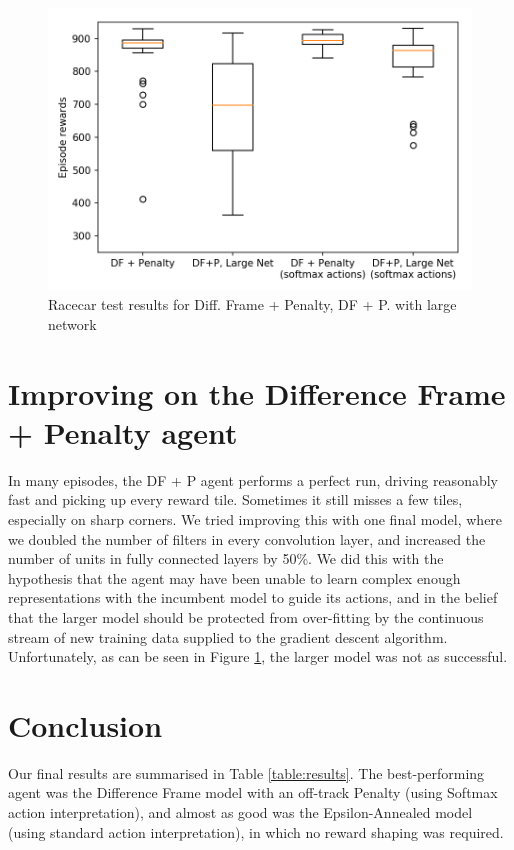 \documentclass[a4paper, 11pt, conference]{ieeeconf}      %
\begin{document}
\begin{figure}
  \includegraphics[width=\linewidth]{figs/racecar_4.png}
  \caption{Racecar test results for Diff. Frame + Penalty, DF + P. with large network}
  \label{fig:test4}
\end{figure}

\section{Improving on the Difference Frame + Penalty agent}

In many episodes, the DF + P agent performs a perfect run, driving reasonably fast and picking up every reward tile. Sometimes it still misses a few tiles, especially on sharp corners. We tried improving this with one final model, where we doubled the number of filters in every convolution layer, and increased the number of units in fully connected layers by 50\%. We did this with the hypothesis that the agent may have been unable to learn complex enough representations with the incumbent model to guide its actions, and in the belief that the larger model should be protected from over-fitting by the continuous stream of new training data supplied to the gradient descent algorithm. Unfortunately, as can be seen in Figure \ref{fig:test4}, the larger model was not as successful.

\section*{Conclusion}

Our final results are summarised in Table \ref{table:results}. The best-performing agent was the Difference Frame model with an off-track Penalty (using Softmax action interpretation), and almost as good was the Epsilon-Annealed model (using standard action interpretation), in which no reward shaping was required.
\end{document}
